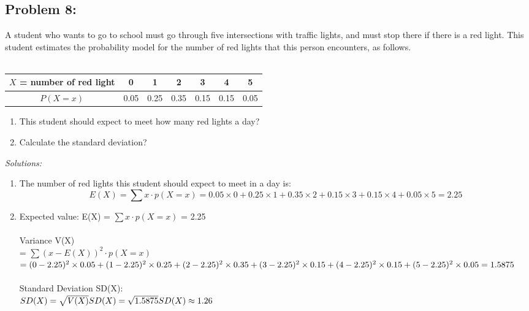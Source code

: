 \documentclass[a4paper]{article}
\begin{document}
\subsection*{Problem 8:}
A student who wants to go to school must go through five intersections with traffic lights, and must stop there if there is a red light. This student estimates the probability model for the number of red lights that this person encounters, as follows. \\ \\
\begin{tabular}{|c|c|c|c|c|c|c|}
	\hline
	$X$ = number of red light & 0    & 1    & 2    & 3    & 4    & 5    \\
	\hline
	$P(X = x)$                & 0.05 & 0.25 & 0.35 & 0.15 & 0.15 & 0.05 \\
	\hline
\end{tabular}
\begin{enumerate}
	\item This student should expect to meet how many red lights a day?
	\item Calculate the standard deviation?
\end{enumerate}
\textit{Solutions:}
\begin{enumerate}
	\item The number of red lights this student should expect to meet in a day is:
	      \begin{equation*}
		      E(X) = \sum x \cdot p(X = x) =  0.05\times 0+0.25\times 1+0.35\times 2+0.15\times 3+0.15\times4+0.05\times 5 = 2.25
	      \end{equation*}
	\item 
	      Expected value: E(X) = $\sum x \cdot p(X = x)$ =  2.25\\\\
	      Variance V(X)\\ 
	      = $\sum (x - E(X))^2\cdot p(X = x)$\\
	      \begin{math}
		      =(0 - 2.25)^2\times0.05 + (1 - 2.25)^2\times0.25+(2-2.25)^2\times 0.35+(3-2.25)^2\times 0.15+(4-2.25)^2\times 0.15+(5-2.25)^2\times 0.05
		      \newline
		      = 1.5875
	      \end{math}\\\\
	      Standard Deviation SD(X):\\
	      \begin{math}
		      SD(X) = \sqrt{V(X)}
		      \newline
		      SD(X) = \sqrt{1.5875}
		      \newline
		      SD(X) \approx 1.26
	      \end{math}
\end{enumerate}
\end{document}
